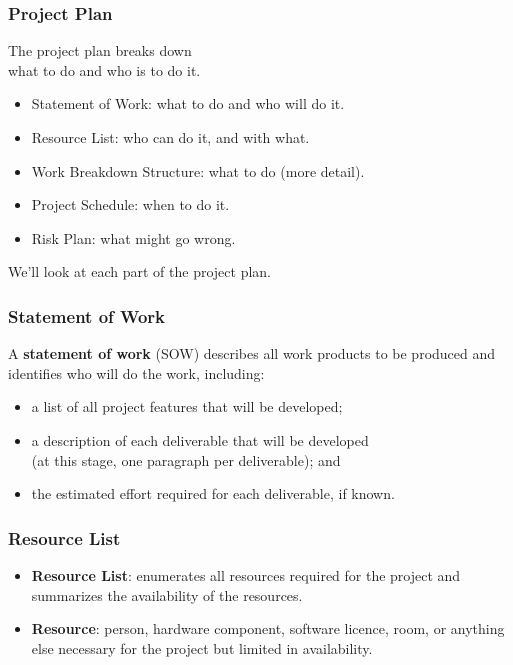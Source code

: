 \begin{frame}
\frametitle{Project Plan}

\begin{changemargin}{1cm}
The project plan breaks down\\ \alert{what} to do and
\alert{who} is to do it.

\begin{itemize}
\item Statement of Work: what to do and who will do it.
\item Resource List: who can do it, and with what.
\item Work Breakdown Structure: what to do (more detail).
\item Project Schedule: when to do it.
\item Risk Plan: what might go wrong.
\end{itemize}

We'll look at each part of the project plan.
\end{changemargin}

\end{frame}

\begin{frame}
\frametitle{Statement of Work}

\begin{changemargin}{1cm}
A {\bf statement of work} (SOW) describes all work products to be
produced and identifies who will do the work, including:

\begin{itemize}
\item a list of \alert{all project features} that will be developed;
\item a \alert{description} of each deliverable that will be developed \\ (at
  this stage, one paragraph per deliverable); and
\item the \alert{estimated effort} required for each deliverable, if known.
\end{itemize}
\end{changemargin}

\end{frame}

\begin{frame}
\frametitle{Resource List}

\begin{changemargin}{1cm}

\begin{itemize}
\item {\bf Resource List}: enumerates all resources required for the
project and summarizes the availability of the resources.

\item {\bf Resource}: person, hardware component, software
licence, room, or anything else necessary for the project
but limited in availability.
\end{itemize}
\end{changemargin}

\end{frame}

